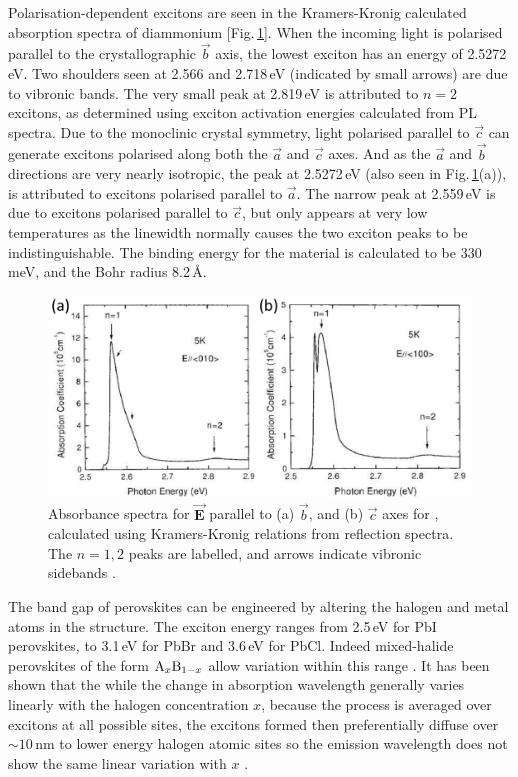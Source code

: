 Polarisation-dependent excitons are seen in the Kramers-Kronig calculated absorption spectra of diammonium  [Fig.\,\ref{2Fig14}]. When the incoming light is polarised parallel to the crystallographic $\vec{b}$ axis, the lowest exciton has an energy of 2.5272\,eV. Two shoulders seen at 2.566 and 2.718\,eV (indicated by small arrows) are due to vibronic bands. The very small peak at 2.819\,eV is attributed to $n=2$ excitons, as determined using exciton activation energies calculated from PL spectra. Due to the monoclinic crystal symmetry, light polarised parallel to $\vec{c}$ can generate excitons polarised along both the $\vec{a}$ and $\vec{c}$ axes. And as the $\vec{a}$ and $\vec{b}$ directions are very nearly isotropic, the peak at 2.5272\,eV (also seen in Fig.\,\ref{2Fig14}(a)), is attributed to excitons polarised parallel to $\vec{a}$. The narrow peak at 2.559\,eV is due to excitons polarised parallel to $\vec{c}$, but only appears at very low temperatures as the linewidth normally causes the two exciton peaks to be indistinguishable. The binding energy for the material is calculated to be 330\,meV, and the Bohr radius 8.2\,\AA \cite{Goto2001}.
\begin{figure} [h!]
\centering
\includegraphics[width=\textwidth]{Fig14}
\caption{Absorbance spectra for $\vec{\mathbf{E}}$ parallel to (a) $\vec{b}$, and (b) $\vec{c}$ axes for , calculated using Kramers-Kronig relations from reflection spectra. The $n=1, 2$ peaks are labelled, and arrows indicate vibronic sidebands \cite{Goto2001}.}
\label{2Fig14}
\end{figure}

The band gap of perovskites can be engineered by altering the halogen and metal atoms in the structure. The exciton energy ranges from 2.5\,eV for PbI perovskites, to 3.1\,eV for PbBr and 3.6\,eV for PbCl. Indeed mixed-halide perovskites of the form $\textnormal{A}_x\textnormal{B}_{1-x}$ allow variation within this range \cite{Kitazawa1996, Kitazawa1997}. It has been shown that the while the change in absorption wavelength generally varies linearly with the halogen concentration $x$, because the process is averaged over excitons at all possible sites, the excitons formed then preferentially diffuse over $\sim10$\,nm to lower energy halogen atomic sites so the emission wavelength does not show the same linear variation with $x$ \cite{Ahmad2013}.


